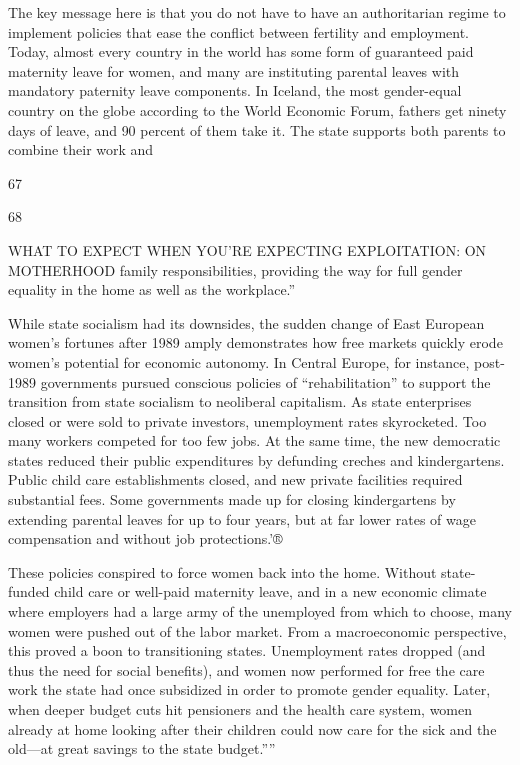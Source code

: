  \par 
The key message here is that you do not have to have an authoritarian regime to implement policies that ease the conflict between fertility and employment. Today, almost every country in the world has some form of guaranteed paid maternity leave for women, and many are instituting parental leaves with mandatory paternity leave components. In Iceland, the most gender-equal country on the globe according to the World Economic Forum, fathers get ninety days of leave, and {\color{blue}90} percent of them take it. The state supports both parents to combine their work and
 \par 
67
 \par 
68
 \par 
WHAT TO EXPECT WHEN YOU'RE EXPECTING EXPLOITATION: ON MOTHERHOOD family responsibilities, providing the way for full gender equality in the home as well as the workplace.”
 \par 
While state socialism had its downsides, the sudden change of East European women’s fortunes after 1989 amply demonstrates how free markets quickly erode women’s potential for economic autonomy. In Central Europe, for instance, post-1989 governments pursued conscious policies of “rehabilitation” to support the transition from state socialism to neoliberal capitalism. As state enterprises closed or were sold to private investors, unemployment rates skyrocketed. Too many workers competed for too few jobs. At the same time, the new democratic states reduced their public expenditures by defunding creches and kindergartens. Public child care establishments closed, and new private facilities required substantial fees. Some governments made up for closing kindergartens by extending parental leaves for up to four years, but at far lower rates of wage compensation and without job protections.'®
 \par 
These policies conspired to force women back into the home. Without state-funded child care or well-paid maternity leave, and in a new economic climate where employers had a large army of the unemployed from which to choose, many women were pushed out of the labor market. From a macroeconomic perspective, this proved a boon to transitioning states. Unemployment rates dropped (and thus the need for social benefits), and women now performed for free the care work the state had once subsidized in order to promote gender equality. Later, when deeper budget cuts hit pensioners and the health care system, women already at home looking after their children could now care for the sick and the old—at great savings to the state budget.””

